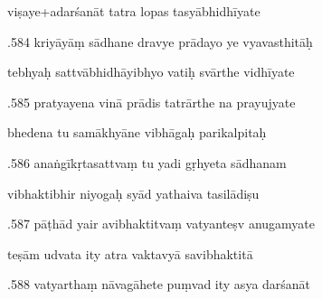 \documentclass[article,12pt,a4paper]{memoir}%
\newcounter{parCount}
\begin{document}
	  
	  \pstart \leavevmode%
	viṣaye+adarśanāt tatra lopas tasyābhidhīyate 
	{}
	\pend%
      

	  
	  \pstart {}.584 kriyāyāṃ sādhane dravye prādayo ye vyavasthitāḥ 
	{}
	\pend%
      

	  
	  \pstart \leavevmode%
	tebhyaḥ sattvābhidhāyibhyo vatiḥ svārthe vidhīyate 
	{}
	\pend%
      

	  
	  \pstart {}.585 pratyayena vinā prādis tatrārthe na prayujyate 
	{}
	\pend%
      

	  
	  \pstart \leavevmode%
	bhedena tu samākhyāne vibhāgaḥ parikalpitaḥ 
	{}
	\pend%
      

	  
	  \pstart {}.586 anaṅgīkṛtasattvaṃ tu yadi gṛhyeta sādhanam 
	{}
	\pend%
      

	  
	  \pstart \leavevmode%
	vibhaktibhir niyogaḥ syād yathaiva tasilādiṣu 
	{}
	\pend%
      

	  
	  \pstart {}.587 pāṭhād yair avibhaktitvaṃ vatyanteṣv anugamyate 
	{}
	\pend%
      

	  
	  \pstart \leavevmode%
	teṣām udvata ity atra vaktavyā savibhaktitā 
	{}
	\pend%
      

	  
	  \pstart {}.588 vatyarthaṃ nāvagāhete puṃvad ity asya darśanāt 
	{}
	\pend%
      
\end{document}

